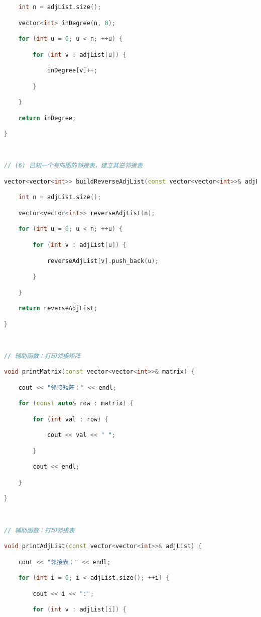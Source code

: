 \begin{lstlisting}[language=C++]
    int n = adjList.size();

    vector<int> inDegree(n, 0);

    for (int u = 0; u < n; ++u) {

        for (int v : adjList[u]) {

            inDegree[v]++;

        }

    }

    return inDegree;

}

  

// (6) 已知一个有向图的邻接表，建立其逆邻接表

vector<vector<int>> buildReverseAdjList(const vector<vector<int>>& adjList) {

    int n = adjList.size();

    vector<vector<int>> reverseAdjList(n);

    for (int u = 0; u < n; ++u) {

        for (int v : adjList[u]) {

            reverseAdjList[v].push_back(u);

        }

    }

    return reverseAdjList;

}

  

// 辅助函数：打印邻接矩阵

void printMatrix(const vector<vector<int>>& matrix) {

    cout << "邻接矩阵：" << endl;

    for (const auto& row : matrix) {

        for (int val : row) {

            cout << val << " ";

        }

        cout << endl;

    }

}

  

// 辅助函数：打印邻接表

void printAdjList(const vector<vector<int>>& adjList) {

    cout << "邻接表：" << endl;

    for (int i = 0; i < adjList.size(); ++i) {

        cout << i << ":";

        for (int v : adjList[i]) {


\end{lstlisting}
